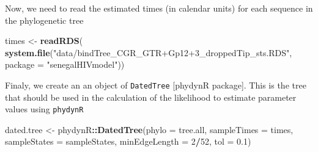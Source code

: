\documentclass[12pt,]{article}
\newenvironment{Shaded}{\begin{snugshade}}{\end{snugshade}}
\newcommand{\CommentTok}[1]{\textcolor[rgb]{0.56,0.35,0.01}{\textit{#1}}}
\newcommand{\DataTypeTok}[1]{\textcolor[rgb]{0.13,0.29,0.53}{#1}}
\newcommand{\DecValTok}[1]{\textcolor[rgb]{0.00,0.00,0.81}{#1}}
\newcommand{\FloatTok}[1]{\textcolor[rgb]{0.00,0.00,0.81}{#1}}
\newcommand{\KeywordTok}[1]{\textcolor[rgb]{0.13,0.29,0.53}{\textbf{#1}}}
\newcommand{\NormalTok}[1]{#1}
\newcommand{\OperatorTok}[1]{\textcolor[rgb]{0.81,0.36,0.00}{\textbf{#1}}}
\newcommand{\StringTok}[1]{\textcolor[rgb]{0.31,0.60,0.02}{#1}}
\begin{document}
\begin{Shaded}
\end{Shaded}

Now, we need to read the estimated times (in calendar units) for each
sequence in the phylogenetic tree

\begin{Shaded}
\begin{Highlighting}[]
\NormalTok{times <-}\StringTok{ }\KeywordTok{readRDS}\NormalTok{(}
  \KeywordTok{system.file}\NormalTok{(}\StringTok{"data/bindTree_CGR_GTR+Gp12+3_droppedTip_sts.RDS"}\NormalTok{,}
  \DataTypeTok{package =} \StringTok{"senegalHIVmodel"}\NormalTok{))}
\end{Highlighting}
\end{Shaded}

Finaly, we create an an object of \texttt{DatedTree} {[}phydynR
package{]}. This is the tree that should be used in the calculation of
the likelihood to estimate parameter values using \texttt{phydynR}

\begin{Shaded}
\begin{Highlighting}[]
\NormalTok{dated.tree <-}\StringTok{ }\NormalTok{phydynR}\OperatorTok{::}\KeywordTok{DatedTree}\NormalTok{(}\DataTypeTok{phylo =}\NormalTok{ tree.all,}
                                 \DataTypeTok{sampleTimes =}\NormalTok{ times,}
                                 \DataTypeTok{sampleStates =}\NormalTok{ sampleStates,}
                                 \DataTypeTok{minEdgeLength =} \DecValTok{2}\OperatorTok{/}\DecValTok{52}\NormalTok{,}
                                 \DataTypeTok{tol =} \FloatTok{0.1}\NormalTok{)}
\end{Highlighting}
\end{Shaded}
\end{document}
